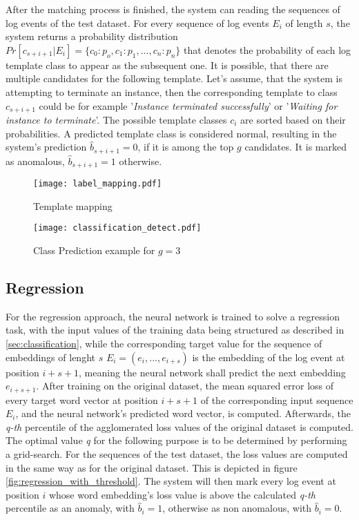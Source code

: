 After the matching process is finished, the system can reading the sequences of log events of the test dataset. For every sequence of log events $E_i$ of length $s$, the system returns a probability distribution $Pr[c_{s+i+1}|E_i] = \{c_0 : p_o, c_1 : p_1, ..., c_n : p_n\}$ that denotes the probability of each log template class to appear as the subsequent one. It is possible, that there are multiple candidates for the following template. Let's assume, that the system is attempting to terminate an instance, then the corresponding template to class $c_{s+i+1}$ could be for example '\textit{Instance terminated successfully}' or '\textit{Waiting for instance to terminate}'. The possible template classes $c_i$ are sorted based on their probabilities. A predicted template class is considered normal, resulting in the system's prediction $\hat{b}_{s+i+1}=0$, if it is among the top $g$ candidates. It is marked as anomalous, $\hat{b}_{s+i+1}=1$ otherwise.
 

\begin{figure}[H]
	\centering
	\captionsetup{justification=centering}
	\texttt{[image: label\_mapping.pdf]}
	\caption{Template mapping}
	\label{fig:label_mapping}
\end{figure}

\begin{figure}[H]
	\centering	
	\texttt{[image: classification\_detect.pdf]}
	\caption{Class Prediction example for $g=3$}
	\label{fig:class_prediction}
\end{figure}

\subsection{Regression \label{sec:regression}}
For the regression approach, the neural network is trained to solve a regression task, with the input values of the training data being structured as described in \ref{sec:classification}, while the corresponding target value for the sequence of embeddings of lenght $s$ $E_i = (e_i, ..., e_{i+s})$ is the embedding of the log event at position $i+s+1$, meaning the neural network shall predict the next embedding $e_{i+s+1}$. After training on the original dataset, the mean squared error loss of every target word vector at position $i+s+1$ of the corresponding input sequence $E_i$, and the neural network's predicted word vector, is computed. Afterwards, the \textit{q-th} percentile of the agglomerated loss values of the original dataset is computed. The optimal value \textit{q} for the following purpose is to be determined by performing a grid-search. For the sequences of the test dataset, the loss values are computed in the same way as for the original dataset. This is depicted in figure \ref{fig:regression_with_threshold}. The system will then mark every log event at position $i$ whose word embedding's loss value is above the calculated \textit{q-th} percentile as an anomaly, with $\hat{b}_i=1$, otherwise as non anomalous, with $\hat{b}_i=0$.

